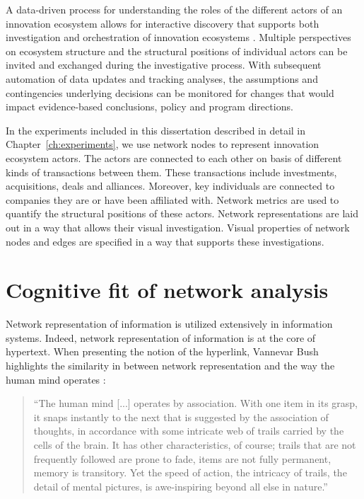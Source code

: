 A data-driven process for understanding the roles of the different actors of an innovation ecosystem allows for interactive discovery that supports both investigation and orchestration of innovation ecosystems \citep{Russell2015RelationalEcosystems}. Multiple perspectives on ecosystem structure and the structural positions of individual actors can be invited and exchanged during the investigative process. With subsequent automation of data updates and tracking analyses, the assumptions and contingencies underlying decisions can be monitored for changes that would impact evidence-based conclusions, policy and program directions.

In the experiments included in this dissertation described in detail in Chapter~\ref{ch:experiments}, we use network nodes to represent innovation ecosystem actors. The actors are connected to each other on basis of different kinds of transactions between them. These transactions include investments, acquisitions, deals and alliances. Moreover, key individuals are connected to companies they are or have been affiliated with. Network metrics are used to quantify the structural positions of these actors. Network representations are laid out in a way that allows their visual investigation. Visual properties of network nodes and edges are specified in a way that supports these investigations.


\section{Cognitive fit of network analysis}

Network representation of information is utilized extensively in information systems. Indeed, network representation of information is at the core of hypertext. When presenting the notion of the hyperlink, Vannevar Bush highlights the similarity in between network representation and the way the human mind operates \citep{Bush1945AsThink}: 

\begin{quote}
``The human mind [...] operates by association. With one item in its grasp, it snaps instantly to the next that is suggested by the association of thoughts, in accordance with some intricate web of trails carried by the cells of the brain. It has other characteristics, of course; trails that are not frequently followed are prone to fade, items are not fully permanent, memory is transitory. Yet the speed of action, the intricacy of trails, the detail of mental pictures, is awe-inspiring beyond all else in nature.''
\end{quote}

